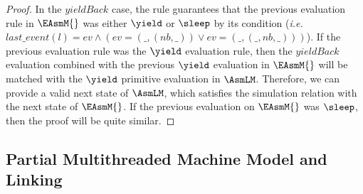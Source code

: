 \begin{proof}
In the $yieldBack$ case, the rule guarantees that the previous evaluation rule in $\EAsmM{}$ was either $\yield$ or $\sleep$ 
by its condition (\textit{i.e.} $last\_event(l) = ev \wedge (ev = (\_, (nb, \_)) \vee ev = (\_, (\_, nb, \_)))$).
If the previous evaluation rule was the $\yield$ evaluation rule,
then the $yieldBack$ evaluation combined with the previous $\yield$ evaluation in $\EAsmM{}$
will be matched with the $\yield$ primitive evaluation in $\AsmLM$. 
Therefore, we can provide a valid next state of $\AsmLM$, which satisfies the simulation relation with the next state of 
$\EAsmM{}$. If the previous evaluation on $\EAsmM{}$ was $\sleep$, then the proof will be quite similar.
\end{proof}

\subsection{Partial Multithreaded Machine Model and Linking}\label{subsec:singleeasm}

